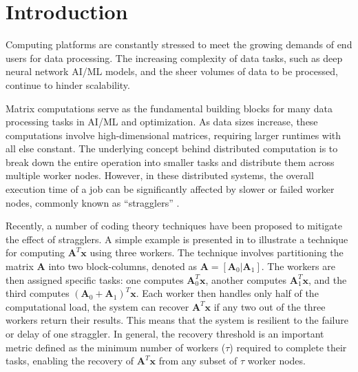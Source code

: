 \documentclass[conference]{IEEEtran}
\theoremstyle{definition}
\newcommand{\bfA}{\mathbf{A}}
\newcommand{\bfx}{\mathbf{x}}
\newcommand\blfootnote[1]{%
  \begingroup
  \renewcommand\thefootnote{}\footnote{#1}%
  \addtocounter{footnote}{-1}%
  \endgroup
}
\begin{document}
\maketitle
\IEEEdisplaynontitleabstractindextext
\IEEEpeerreviewmaketitle
\section{Introduction}
\label{sec:intro}
Computing platforms are constantly stressed to meet the growing demands of end users for data processing. The increasing complexity of data tasks, such as deep neural network AI/ML models, and the sheer volumes of data to be processed, continue to hinder scalability. 

Matrix computations serve as the fundamental building blocks for many data processing tasks in AI/ML and optimization. As data sizes increase, these computations involve high-dimensional matrices, requiring larger runtimes with all else constant. The underlying concept behind distributed computation is to break down the entire operation into smaller tasks and distribute them across multiple worker nodes. However, in these distributed systems, the overall execution time of a job can be significantly affected by slower or failed worker nodes, commonly known as ``stragglers'' \cite{ramamoorthyDTMag20}. %

Recently, a number of coding theory techniques \cite{lee2018speeding, das2019random, dutta2016short, yu2017polynomial, c3les, yu2020straggler, tandon2017gradient, dasunifiedtreatment,  9513242, das2023jsait_submitted, 8849468, 8919859} have been proposed to mitigate the effect of stragglers. A simple example is presented in \cite{lee2018speeding} to illustrate a technique for computing $\bfA^T \bfx$ using three workers. The technique involves partitioning the matrix $\bfA$ into two block-columns, denoted as $\bfA = [\bfA_0 | \bfA_1]$. The workers are then assigned specific tasks: one computes $\bfA_0^T \bfx$, another computes $\bfA_1^T \bfx$, and the third computes $(\bfA_0 + \bfA_1)^T \bfx$. Each worker then handles only half of the computational load, the system can recover $\bfA^T \bfx$ if any two out of the three workers return their results. This means that the system is resilient to the failure or delay of one straggler. In general, the recovery threshold is an important metric defined as the minimum number of workers ($\tau$) required to complete their tasks, enabling the recovery of $\bfA^T \bfx$ from any subset of $\tau$ worker nodes. 
\end{document}
